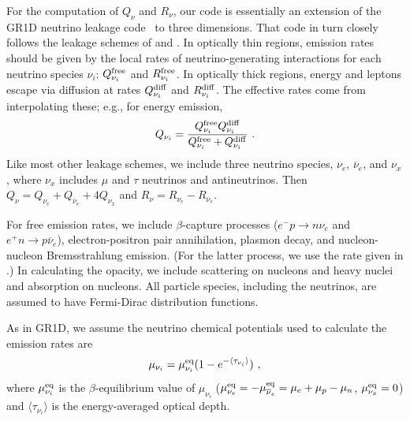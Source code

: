 For the computation of $Q_{\nu}$ and $R_{\nu}$, our code is
essentially an extension of the GR1D neutrino leakage
code~\citep{ocon2010-gr1d} to three dimensions.  That code in turn closely
follows the leakage schemes of \cite{ruff1996-leakage_part1} and
\cite{ross2003-leakage_part2}.  In optically thin regions,
emission rates should be given by the local rates of
neutrino-generating interactions for each neutrino species
$\nu_i$:  $Q_{\nu_i}^{\rm free}$ and $R_{\nu_i}^{\rm free}$.  In
optically thick regions, energy and leptons escape via diffusion
at rates $Q_{\nu_i}^{\rm diff}$ and $R_{\nu_i}^{\rm diff}$.  The effective
rates come from interpolating these; e.g., for energy emission,
\begin{equation}
  Q_{\nu_i} =
  \frac{Q_{\nu_i}^{\rm free}Q_{\nu_i}^{\rm diff}}
       {Q_{\nu_i}^{\rm free}+ Q_{\nu_i}^{\rm diff}}\ .
\end{equation}
Like most other leakage schemes, we include three neutrino species,
$\nu_e$, $\overline{\nu}_e$, and $\nu_x$, where $\nu_x$ includes
$\mu$ and $\tau$ neutrinos and antineutrinos.  Then
$Q_{\nu}=Q_{\nu_e} + Q_{\overline{\nu}_e} + 4 Q_{\nu_x}$ and
$R_{\nu}=R_{\nu_e}-R_{\overline{\nu}_e}$.

For free emission rates, we include $\beta$-capture processes
($e^{-}p \rightarrow n\nu_{e}$ and $e^{+}n \rightarrow p\overline{\nu}_{e}$),
electron-positron pair annihilation, plasmon decay, and
nucleon-nucleon Bremsstrahlung emission.  (For the latter process,
we use the rate given in \citealt{burr2006-neutrino_opacities}.)  In calculating the opacity,
we include scattering on nucleons and heavy nuclei and absorption
on nucleons.  All particle species, including the neutrinos, are
assumed to have Fermi-Dirac distribution functions.

As in GR1D, we assume the neutrino chemical potentials
used to calculate the emission rates are
\begin{equation}
\label{mu_nu}
\mu_{\nu_i} = \mu_{\nu_i}^{\rm eq}(1-e^{-\langle\tau_{\nu_i}\rangle})\ ,
\end{equation}
where $\mu_{\nu_i}^{\rm eq}$ is the $\beta$-equilibrium value of
$\mu_{\nu_i}$ ($\mu^{\rm eq}_{\nu_e}=-\mu^{\rm eq}_{\overline{\nu}_e}
=\mu_e+\mu_p-\mu_n$, $\mu^{\rm eq}_{\nu_x}=0$) and $\langle\tau_{\nu_i}\rangle$ is
the energy-averaged optical depth.

